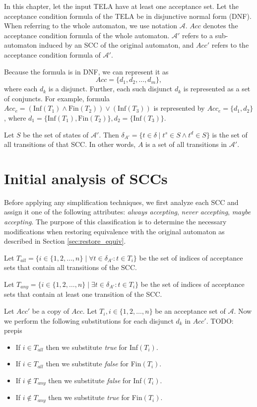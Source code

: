 \documentclass[
  digital, %
  twoside, %
  table,   %
  lof,     %
  lot,     %
]{fithesis3}
\begin{document}
In this chapter, let the input TELA have at least one acceptance set. Let the acceptance condition formula of the TELA be in disjunctive normal form (DNF). When referring to the whole automaton, we use notation $\mathcal{A}$. $Acc$ denotes the acceptance condition formula of the whole automaton. $\mathcal{A'}$ refers to a sub-automaton induced by an SCC of the original automaton, and $Acc'$ refers to the acceptance condition formula of $\mathcal{A'}$.

Because the formula is in DNF, we can represent it as 
\begin{equation*}
  Acc = \{d_1, d_2, \dots, d_m\},
\end{equation*}
where each $d_k$ is a disjunct. Further, each such disjunct $d_k$ is represented as a set of conjuncts. For example, formula $Acc_e = (\text{Inf}(T_1) \wedge \text{Fin}(T_2)) \vee (\text{Inf}(T_3))$ is represented by $Acc_e = \{d_1, d_2\}$, where $d_1 = \{\text{Inf}(T_1), \text{Fin}(T_2)\}, d_2 = \{\text{Inf}(T_3)\}$. 

Let $S$ be the set of states of $\mathcal{A'}$. Then $\delta_{A'} = \{t \in \delta \mid t^s \in S \wedge t^d \in S\}$ is the set of all transitions of that SCC. In other words, $A$ is a set of all transitions in $\mathcal{A'}$.

\section{Initial analysis of SCCs}
\label{sec:init_analysis}
Before applying any simplification techniques, we first analyze each SCC and assign it one of the following attributes: \emph{always accepting}, \emph{never accepting}, \emph{maybe accepting}. The purpose of this classification is to determine the necessary modifications when restoring equivalence with the original automaton as described in Section \ref{sec:restore_equiv}. 

Let $T_{all} = \{i \in \{1, 2, \dots, n\} \mid \forall t \in \delta_{A'} \colon t \in T_i \}$ be the set of indices of acceptance sets that contain all transitions of the SCC.

Let $T_{any} = \{i \in \{1, 2, \dots, n\} \mid \exists t \in \delta_{A'} \colon t \in T_i \}$ be the set of indices of acceptance sets that contain at least one transition of the SCC.

Let $Acc'$ be a copy of $Acc$. Let $T_i, i \in \{1, 2, \dots, n\}$ be an acceptance set of $\mathcal{A}$. Now we perform the following substitutions for each disjunct $d_k$ in $Acc'$. TODO: prepis
\begin{itemize}
  \item If $i \in T_{all}$ then we substitute \emph{true} for Inf$(T_i)$.
  \item If $i \in T_{all}$ then we substitute \emph{false} for Fin$(T_i)$.
  \item If $i \notin T_{any}$ then we substitute \emph{false} for Inf$(T_i)$.
  \item If $i \notin T_{any}$ then we substitute \emph{true} for Fin$(T_i)$.
\end{itemize}
\end{document}
